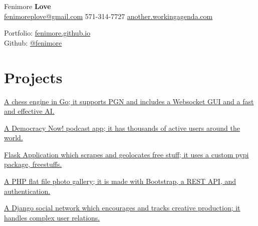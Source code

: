 \documentclass[]{deedy-resume-openfont}
\begin{document}
%
%

%
%
\begin{minipage}[t]{.6\textwidth}
{\Huge Fenimore {\textbf{Love}}}\\
\href{mailto:fenimoreplove@gmail.com}{fenimoreplove@gmail.com} \textbullet{} 571-314-7727 \textbullet{} \href{http://another.workingagenda.com}{another.workingagenda.com}\\
\end{minipage}
\hfill
\begin{minipage}[t]{.3\textwidth}
Portfolio: \href{https://fenimore.github.io}{fenimore.github.io}\\
Github: \href{https://github.com/fenimore}{@fenimore}
\end{minipage}
\namesection{}{} %

\section{Projects}
\href{https://ghess-chess.herokuapp.com/}{A chess engine in Go; it supports PGN and includes a Websocket GUI and a fast and effective AI.}
\sectionsep

\href{https://play.google.com/store/apps/details?id=com.workingagenda.democracydroid}{A Democracy Now! podcast app; it has thousands of active users around the world.}
\sectionsep

\href{http://treasure.plyp.org}{ Flask Application which scrapes and geolocates free stuff; it uses a custom pypi package, freestuffs.}
\sectionsep

\href{http://wink.plyp.org}{A PHP flat file photo gallery; it is made with Bootstrap, a REST API, and authentication.}
\sectionsep

\href{http://realmess.plyp.org/}{A Django social network which encourages and tracks creative production; it handles complex user relations.}
\sectionsep
\end{document}
